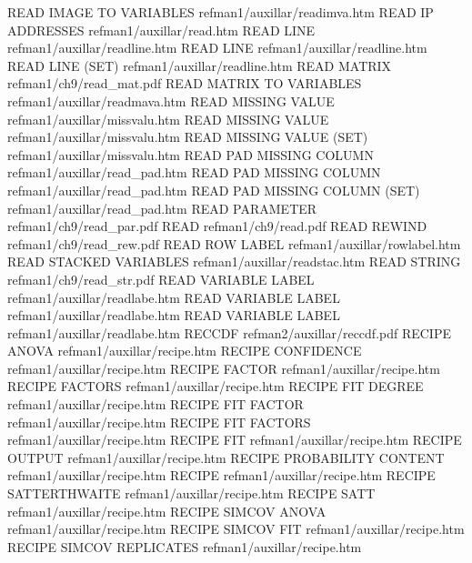 READ IMAGE TO VARIABLES                 refman1/auxillar/readimva.htm
READ IP ADDRESSES                       refman1/auxillar/read.htm
READ LINE                               refman1/auxillar/readline.htm
READ LINE                               refman1/auxillar/readline.htm
READ LINE (SET)                         refman1/auxillar/readline.htm
READ MATRIX                             refman1/ch9/read_mat.pdf
READ MATRIX TO VARIABLES                refman1/auxillar/readmava.htm
READ MISSING VALUE                      refman1/auxillar/missvalu.htm
READ MISSING VALUE                      refman1/auxillar/missvalu.htm
READ MISSING VALUE (SET)                refman1/auxillar/missvalu.htm
READ PAD MISSING COLUMN                 refman1/auxillar/read_pad.htm
READ PAD MISSING COLUMN                 refman1/auxillar/read_pad.htm
READ PAD MISSING COLUMN (SET)           refman1/auxillar/read_pad.htm
READ PARAMETER                          refman1/ch9/read_par.pdf
READ                                    refman1/ch9/read.pdf
READ REWIND                             refman1/ch9/read_rew.pdf
READ ROW LABEL                          refman1/auxillar/rowlabel.htm
READ STACKED VARIABLES                  refman1/auxillar/readstac.htm
READ STRING                             refman1/ch9/read_str.pdf
READ VARIABLE LABEL                     refman1/auxillar/readlabe.htm
READ VARIABLE LABEL                     refman1/auxillar/readlabe.htm
READ VARIABLE LABEL                     refman1/auxillar/readlabe.htm
RECCDF                                  refman2/auxillar/reccdf.pdf
RECIPE ANOVA                            refman1/auxillar/recipe.htm
RECIPE CONFIDENCE                       refman1/auxillar/recipe.htm
RECIPE FACTOR                           refman1/auxillar/recipe.htm
RECIPE FACTORS                          refman1/auxillar/recipe.htm
RECIPE FIT DEGREE                       refman1/auxillar/recipe.htm
RECIPE FIT FACTOR                       refman1/auxillar/recipe.htm
RECIPE FIT FACTORS                      refman1/auxillar/recipe.htm
RECIPE FIT                              refman1/auxillar/recipe.htm
RECIPE OUTPUT                           refman1/auxillar/recipe.htm
RECIPE PROBABILITY CONTENT              refman1/auxillar/recipe.htm
RECIPE                                  refman1/auxillar/recipe.htm
RECIPE SATTERTHWAITE                    refman1/auxillar/recipe.htm
RECIPE SATT                             refman1/auxillar/recipe.htm
RECIPE SIMCOV ANOVA                     refman1/auxillar/recipe.htm
RECIPE SIMCOV FIT                       refman1/auxillar/recipe.htm
RECIPE SIMCOV REPLICATES                refman1/auxillar/recipe.htm
